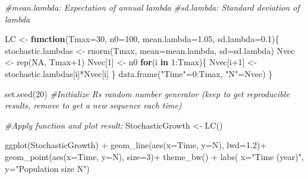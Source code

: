 \documentclass[
]{book}
\newenvironment{Shaded}{\begin{snugshade}}{\end{snugshade}}
\newcommand{\AttributeTok}[1]{\textcolor[rgb]{0.77,0.63,0.00}{#1}}
\newcommand{\CommentTok}[1]{\textcolor[rgb]{0.56,0.35,0.01}{\textit{#1}}}
\newcommand{\ConstantTok}[1]{\textcolor[rgb]{0.00,0.00,0.00}{#1}}
\newcommand{\ControlFlowTok}[1]{\textcolor[rgb]{0.13,0.29,0.53}{\textbf{#1}}}
\newcommand{\DecValTok}[1]{\textcolor[rgb]{0.00,0.00,0.81}{#1}}
\newcommand{\FloatTok}[1]{\textcolor[rgb]{0.00,0.00,0.81}{#1}}
\newcommand{\FunctionTok}[1]{\textcolor[rgb]{0.00,0.00,0.00}{#1}}
\newcommand{\NormalTok}[1]{#1}
\newcommand{\OtherTok}[1]{\textcolor[rgb]{0.56,0.35,0.01}{#1}}
\newcommand{\SpecialCharTok}[1]{\textcolor[rgb]{0.00,0.00,0.00}{#1}}
\newcommand{\StringTok}[1]{\textcolor[rgb]{0.31,0.60,0.02}{#1}}
\begin{document}
\begin{Shaded}
\begin{Highlighting}[]
\CommentTok{\#mean.lambda: Expectation of annual lambda}
\CommentTok{\#sd.lambda: Standard deviation of lambda}

\NormalTok{LC }\OtherTok{\textless{}{-}} \ControlFlowTok{function}\NormalTok{(}\AttributeTok{Tmax=}\DecValTok{30}\NormalTok{, }\AttributeTok{n0=}\DecValTok{100}\NormalTok{, }\AttributeTok{mean.lambda=}\FloatTok{1.05}\NormalTok{, }\AttributeTok{sd.lambda=}\FloatTok{0.1}\NormalTok{)\{}
\NormalTok{  stochastic.lambdas }\OtherTok{\textless{}{-}} \FunctionTok{rnorm}\NormalTok{(Tmax, }\AttributeTok{mean=}\NormalTok{mean.lambda, }\AttributeTok{sd=}\NormalTok{sd.lambda)}
\NormalTok{  Nvec }\OtherTok{\textless{}{-}} \FunctionTok{rep}\NormalTok{(}\ConstantTok{NA}\NormalTok{, Tmax}\SpecialCharTok{+}\DecValTok{1}\NormalTok{)}
\NormalTok{  Nvec[}\DecValTok{1}\NormalTok{] }\OtherTok{\textless{}{-}}\NormalTok{ n0}
  \ControlFlowTok{for}\NormalTok{(i }\ControlFlowTok{in} \DecValTok{1}\SpecialCharTok{:}\NormalTok{Tmax)\{}
\NormalTok{    Nvec[i}\SpecialCharTok{+}\DecValTok{1}\NormalTok{] }\OtherTok{\textless{}{-}}\NormalTok{ stochastic.lambdas[i]}\SpecialCharTok{*}\NormalTok{Nvec[i]}
\NormalTok{  \}}
  \FunctionTok{data.frame}\NormalTok{(}\StringTok{"Time"}\OtherTok{=}\DecValTok{0}\SpecialCharTok{:}\NormalTok{Tmax, }\StringTok{"N"}\OtherTok{=}\NormalTok{Nvec)}
\NormalTok{\}}

\FunctionTok{set.seed}\NormalTok{(}\DecValTok{20}\NormalTok{) }\CommentTok{\#Initialize R\textquotesingle{}s random number generator (keep to get reproducible results, remove to get a new sequence each time)}

\CommentTok{\#Apply function and plot result:}
\NormalTok{StochasticGrowth }\OtherTok{\textless{}{-}} \FunctionTok{LC}\NormalTok{()}

\FunctionTok{ggplot}\NormalTok{(StochasticGrowth) }\SpecialCharTok{+} 
  \FunctionTok{geom\_line}\NormalTok{(}\FunctionTok{aes}\NormalTok{(}\AttributeTok{x=}\NormalTok{Time, }\AttributeTok{y=}\NormalTok{N), }\AttributeTok{lwd=}\FloatTok{1.2}\NormalTok{)}\SpecialCharTok{+}
  \FunctionTok{geom\_point}\NormalTok{(}\FunctionTok{aes}\NormalTok{(}\AttributeTok{x=}\NormalTok{Time, }\AttributeTok{y=}\NormalTok{N), }\AttributeTok{size=}\DecValTok{3}\NormalTok{)}\SpecialCharTok{+}
  \FunctionTok{theme\_bw}\NormalTok{() }\SpecialCharTok{+}
  \FunctionTok{labs}\NormalTok{( }\AttributeTok{x=}\StringTok{"Time (year)"}\NormalTok{, }\AttributeTok{y=}\StringTok{"Population size N"}\NormalTok{)  }
\end{Highlighting}
\end{Shaded}
\end{document}
